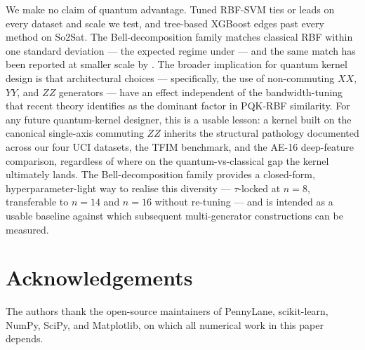 \documentclass[pdflatex,sn-mathphys]{sn-jnl}
\theoremstyle{plain}
\theoremstyle{remark}
\theoremstyle{definition}
\begin{document}
\medskip
\noindent We make no claim of quantum advantage. Tuned RBF-SVM ties or leads on every dataset and scale we test, and tree-based XGBoost edges past every method on So2Sat. The Bell-decomposition family matches classical RBF within one standard deviation --- the expected regime under \cite{canatar2022,florezablan2025} --- and the same match has been reported at smaller scale by \cite{schnabel2025,bowles2024,rodriguez2025}. The broader implication for quantum kernel design is that architectural choices --- specifically, the use of non-commuting $XX$, $YY$, and $ZZ$ generators --- have an effect independent of the bandwidth-tuning that recent theory identifies as the dominant factor in PQK-RBF similarity.  For any future quantum-kernel designer, this is a usable lesson: a kernel built on the canonical single-axis commuting $ZZ$ inherits the structural pathology documented across our four UCI datasets, the TFIM benchmark, and the AE-16 deep-feature comparison, regardless of where on the quantum-vs-classical gap the kernel ultimately lands.  The Bell-decomposition family provides a closed-form, hyperparameter-light way to realise this diversity --- $\tau$-locked at $n=8$, transferable to $n=14$ and $n=16$ without re-tuning --- and is intended as a usable baseline against which subsequent multi-generator constructions can be measured.

\section*{Acknowledgements}
The authors thank the open-source maintainers of PennyLane, scikit-learn, NumPy, SciPy, and Matplotlib, on which all numerical work in this paper depends.
\end{document}
